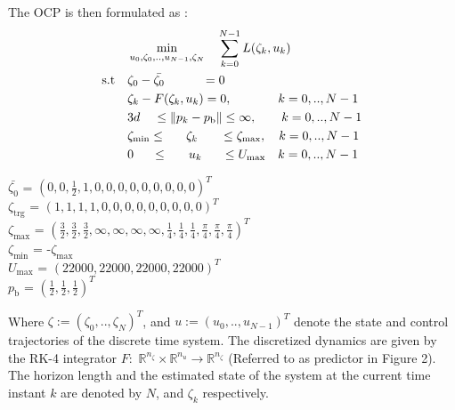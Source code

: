 \documentclass[conference]{IEEEtran}
\begin{document}
The OCP is then formulated as :
\begin{align}
	&\min_{u_0,\zeta_0,..,u_{N-1},\zeta_N} \quad \sum_{k = 0}^{N-1} L(\zeta_k, u_k) \\
	\text{s.t} \quad 
	& \zeta_0 - \bar{\zeta_0} \hspace{0.42in} = 0\\
    & \zeta_k - F(\zeta_k, u_k) = 0, \hspace{0.1in}\quad\qquad k = 0,..,N-1 \\
    & 3d \hspace{0.15in} \le \lVert p_k - p_{\mathrm{b}} \rVert \le  \infty, \qquad  k = 0,..,N-1 \\
	& \zeta_{\mathrm{min}} \le \hspace{0.22in} \zeta_k \hspace{0.25in} \le \zeta_{\mathrm{max}}, \quad k = 0,..,N-1 \\
    & 0 \hspace{0.2in} \le \hspace{0.23in} u_k \hspace{0.22in} \le U_{\mathrm{max}} \quad k = 0,..,N-1
\end{align}

\begin{flushleft}
$\bar{\zeta_0}$ \hspace{0.18in}= $(0, 0, \frac{1}{2}, 1, 0, 0, 0, 0, 0, 0, 0, 0, 0)^T$\\
$\zeta_{\mathrm{trg}}$ \hspace{0.08in}= $( 1, 1, 1, 1, 0, 0, 0, 0, 0, 0, 0, 0, 0)^T$\\
$\zeta_{\mathrm{max}}$ \hspace{0.03in}= $(\frac{3}{2},\frac{3}{2},\frac{3}{2},\infty,\infty,\infty,\infty,\frac{1}{4},\frac{1}{4},\frac{1}{4},\frac{\pi}{4},\frac{\pi}{4},\frac{\pi}{4})^T$\\
$\zeta_{\mathrm{min}}$ \hspace{0.05in}= -$\zeta_{\mathrm{max}}$\\
$U_{\mathrm{max}}$ = $(22000, 22000, 22000, 22000)^T$\\
$p_\mathrm{b}$ \hspace{0.18in}= $(\frac{1}{2}, \frac{1}{2}, \frac{1}{2})^T$\\
\end{flushleft}

Where $\zeta := (\zeta_0, .., \zeta_N)^T$, and $u := (u_0, .., u_{N-1})^T$ denote the state and control trajectories of the discrete time system. The discretized dynamics are given by the RK-4 integrator $F :$ $\mathbb{R}^{n_{\zeta}} \times \mathbb{R}^{n_{u}} \rightarrow \mathbb{R}^{n_{\zeta}}$ (Referred to as predictor in Figure 2). The horizon length and the estimated state of the system at the current time instant $k$ are denoted by $N$, and $\zeta_k$ respectively.
\end{document}
